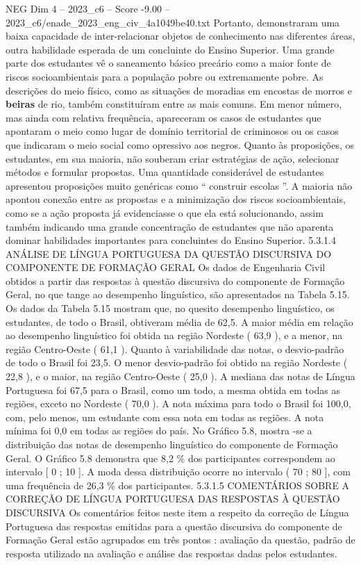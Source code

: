 \begin{textsample}{NEG Dim 4 – 2023\_c6 – Score -9.00 – 2023\_c6/enade\_2023\_eng\_civ\_4a1049be40.txt}
Portanto, demonstraram uma baixa capacidade de inter-relacionar objetos de conhecimento nas diferentes áreas, outra habilidade esperada de um concluinte do Ensino Superior.
Uma grande parte dos estudantes vê o saneamento básico precário como a maior fonte de riscos socioambientais para a população pobre ou extremamente pobre.
As descrições do meio físico, como as situações de moradias em encostas de morros e \textbf{beiras} de rio, também constituíram entre as mais comuns.
Em menor número, mas ainda com relativa frequência, apareceram os casos de estudantes que apontaram o meio como lugar de domínio territorial de criminosos ou os casos que indicaram o meio social como opressivo aos negros.
Quanto às proposições, os estudantes, em sua maioria, não souberam criar estratégias de ação, selecionar métodos e formular propostas.
Uma quantidade considerável de estudantes apresentou proposições muito genéricas como “ construir escolas ”.
A maioria não apontou conexão entre as propostas e a minimização dos riscos socioambientais, como se a ação proposta já evidenciasse o que ela está solucionando, assim também indicando uma grande concentração de estudantes que não aparenta dominar habilidades importantes para concluintes do Ensino Superior. 5.3.1.4 ANÁLISE DE LÍNGUA PORTUGUESA DA QUESTÃO DISCURSIVA DO COMPONENTE DE FORMAÇÃO GERAL Os dados de Engenharia Civil obtidos a partir das respostas à questão discursiva do componente de Formação Geral, no que tange ao desempenho linguístico, são apresentados na Tabela 5.15.
Os dados da Tabela 5.15 mostram que, no quesito desempenho linguístico, os estudantes, de todo o Brasil, obtiveram média de 62,5.
A maior média em relação ao desempenho linguístico foi obtida na região Nordeste ( 63,9 ), e a menor, na região Centro-Oeste ( 61,1 ).
Quanto à variabilidade das notas, o desvio-padrão de todo o Brasil foi 23,5.
O menor desvio-padrão foi obtido na região Nordeste ( 22,8 ), e o maior, na região Centro-Oeste ( 25,0 ).
A mediana das notas de Língua Portuguesa foi 67,5 para o Brasil, como um todo, a mesma obtida em todas as regiões, exceto no Nordeste ( 70,0 ).
A nota máxima para todo o Brasil foi 100,0, com, pelo menos, um estudante com essa nota em todas as regiões.
A nota mínima foi 0,0 em todas as regiões do país.
No Gráfico 5.8, mostra -se a distribuição das notas de desempenho linguístico do componente de Formação Geral.
O Gráfico 5.8 demonstra que 8,2 \% dos participantes correspondem ao intervalo [ 0 ; 10 ].
A moda dessa distribuição ocorre no intervalo ( 70 ; 80 ], com uma frequência de 26,3 \% dos participantes. 5.3.1.5 COMENTÁRIOS SOBRE A CORREÇÃO DE LÍNGUA PORTUGUESA DAS RESPOSTAS À QUESTÃO DISCURSIVA Os comentários feitos neste item a respeito da correção de Língua Portuguesa das respostas emitidas para a questão discursiva do componente de Formação Geral estão agrupados em três pontos : avaliação da questão, padrão de resposta utilizado na avaliação e análise das respostas dadas pelos estudantes.

\end{textsample}
